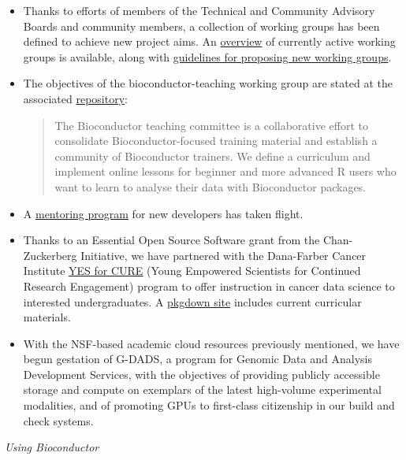 \begin{itemize}
\item Thanks to efforts of members of the Technical and Community Advisory
Boards and community members, a collection of working groups has been defined
to achieve new project aims.  An \href{http://workinggroups.bioconductor.org/currently-active-working-groups-committees.html}{overview} of currently active working
groups is available, along with \href{http://workinggroups.bioconductor.org/working-group-and-committee-guidelines.html}{guidelines for proposing new working groups}.
\item The objectives of the bioconductor-teaching working group are stated at
the associated \href{https://github.com/bioconductor/bioconductor-teaching}{repository}:
\begin{quotation}
The Bioconductor teaching committee is a collaborative effort to consolidate Bioconductor-focused training material and establish a community of Bioconductor trainers. We define a curriculum and implement online lessons for beginner and more advanced R users who want to learn to analyse their data with Bioconductor packages.
\end{quotation}
\item A \href{https://bioconductor.org/developers/new-developer-program/}{mentoring program} for new
developers has taken flight.
\item Thanks to an Essential Open Source Software grant from the Chan-Zuckerberg Initiative, 
we have partnered with the Dana-Farber Cancer Institute \href{https://www.dfhcc.harvard.edu/research/cancer-disparities/students/yes-for-cure/}{YES for CURE} (Young Empowered Scientists for Continued Research Engagement)
program to offer instruction in cancer data science to interested undergraduates.  A
\href{https://vjcitn.github.io/YESCDS/}{pkgdown site} includes current curricular materials.
\item With the NSF-based academic cloud resources previously mentioned, we have begun gestation
of G-DADS, a program for Genomic Data and Analysis Development Services, with the objectives
of providing publicly accessible storage and compute on exemplars of the latest
high-volume experimental modalities, and of promoting GPUs to first-class citizenship
in our build and check systems.
\end{itemize}





\textit{Using Bioconductor}

